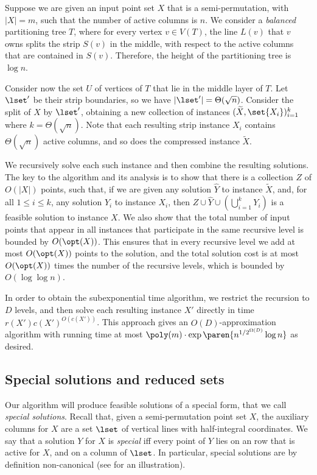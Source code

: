 Suppose we are given an input point set $X$ that is a semi-permutation, with $|X|=m$, such that the number of active columns is $n$. We consider a \emph{balanced} partitioning tree $T$, where for every vertex $v\in V(T)$, the line $L(v)$ that $v$ owns splits the strip $S(v)$ in the middle, with respect to the active columns that are contained in $S(v)$. Therefore, the height of the partitioning tree is $\log n$.

Consider now the set $U$ of vertices of $T$ that lie in the middle layer of $T$. Let $\lset'$ be their strip boundaries, so we have $|\lset'| = \Theta(\sqrt{n})$. Consider the split of $X$ by $\lset'$,  obtaining a new collection of instances $(\widetilde{X}, \set{X_i})_{i=1}^k$ where $k = \Theta(\sqrt{n})$. Note that each resulting strip instance $X_i$ contains $\Theta(\sqrt{n})$ active columns, and so does the compressed instance $\widetilde{X}$.
 
We recursively solve each such instance and then  combine the resulting solutions.
The key to the algorithm and its analysis is to show that there is a collection $Z$ of $O(|X|)$ points, such that, if we are given any  solution $\widehat{Y}$ to instance $\widetilde{X}$, and, for all $1\leq i\leq k$, any  solution $Y_i$ to instance $X_i$, then $Z\cup \widehat{Y}\cup \left(\bigcup_{i=1}^k Y_i\right) $ is a feasible solution to instance $X$. We also show that the total number of input points that appear in all instances that participate in the same recursive level is bounded by $O(\opt(X))$. This ensures that in every recursive level we add at most $O(\opt(X))$ points to the solution, and the total solution cost is at most $O(\opt(X))$ times the number of the recursive levels, which is bounded by $O(\log\log n)$.

In order to obtain the subexponential time algorithm, we restrict the recursion to $D$ levels, and then solve each resulting instance $X'$ directly in time $r(X') c(X')^{O(c(X'))}$. %
This approach gives an $O(D)$-approximation algorithm with running time at most  $\poly(m)\cdot \exp\paren{n^{1/2^{\Omega(D)}} \log n}$ as desired. 
%
%

%
%
%
%

\subsection{Special solutions and reduced sets} %

Our algorithm will produce feasible solutions of a special form, that we call \emph{special solutions}. Recall that, given a semi-permutation point set $X$, the auxiliary columns for $X$ are a set $\lset$ of vertical lines with half-integral coordinates. We say that a solution $Y$ for $X$ is \emph{special} iff every point of $Y$ lies on an row that is active for $X$, and on a column of $\lset$. In particular, special solutions are by definition non-canonical (see  for an illustration).  





